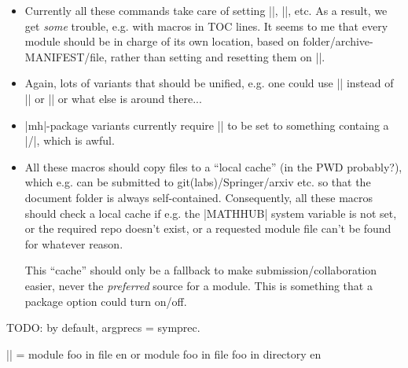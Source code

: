 \documentclass{bluenote}
\begin{document}
\begin{itemize}
  \item Currently all these commands take care of setting |\this@module|, |\mh@currentrepos|, etc.
    As a result, we get \emph{some} trouble, e.g. with \sTeX macros in TOC lines. It seems
    to me that every module should be in charge of its own location, based on folder/archive-MANIFEST/file,
    rather than setting and resetting them on ||.

  \item Again, lots of variants that should be unified, e.g. 
    one could use || instead of |\gimport| or |\mhinclude| or what else is around there...
  \item |mh|-package variants currently require |\mh@currentrepos| to be set to something
    containg a |/|, which is awful.
  \item All these macros should copy files to a ``local cache'' (in the PWD probably?), which e.g. 
    can be submitted to git(labs)/Springer/arxiv etc. so that the document folder is always self-contained. 
    Consequently, all these macros should check a local cache if e.g. the |MATHHUB| system variable
    is not set, or the required repo doesn't exist, or a requested module file can't be found
    for whatever reason.

    This ``cache'' should only be a fallback to make submission/collaboration easier, 
    never the \emph{preferred} source for a module. This is something that a package
    option could turn on/off.
\end{itemize}


TODO: by default, argprecs = symprec.

|| = module foo in file en or module foo in
file foo in directory en
\end{document}
